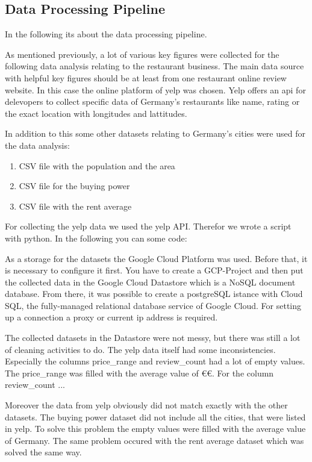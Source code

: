 \subsection{Data Processing Pipeline}
\label{subsec:pipeline}
In the following its about the data processing pipeline.

\label{subsec:Data sources}
As mentioned previously, a lot of various key figures were collected for the following data analysis relating to the restaurant business. The main data source with helpful key figures should be at least from one restaurant online review website. In this case the online platform of yelp was chosen. Yelp offers an api for delevopers to collect specific data of Germany's restaurants like name, rating or the exact location with longitudes and lattitudes.   

In addition to this some other datasets relating to Germany's cities were used for the data analysis:
\begin{enumerate}
\item CSV file with the population and the area
\item CSV file for the buying power
\item CSV file with the rent average
\end{enumerate}

\label{subsec:Data Ingestion}
For collecting the yelp data we used the yelp API. Therefor we wrote a script with python. In the following you can some code:

\label{subsec:Data Storage}
As a storage for the datasets the Google Cloud Platform was used. Before that, it is necessary to configure it first. You have to create a GCP-Project and then put the collected data in the Google Cloud Datastore which is a NoSQL document database. From there, it was possible to create a postgreSQL istance with Cloud SQL, the fully-managed relational database service of Google Cloud. For setting up a connection a proxy or current ip address is required.

\label{subsec:Data cleaning}
The collected datasets in the Datastore were not messy, but there was still a lot of cleaning activities to do. The yelp data itself had some inconsistencies. Especially the columns price\_range and review\_count had a lot of empty values. The price\_range was filled with the average value of \euro\euro. For the column review\_count ...%

Moreover the data from yelp obviously did not match exactly with the other datasets. The buying power dataset did not include all the cities, that were listed in yelp. To solve this problem the empty values were filled with the average value of Germany. The same problem occured with the rent average dataset which was solved the same way.

\label{subsec:Data analysis}
